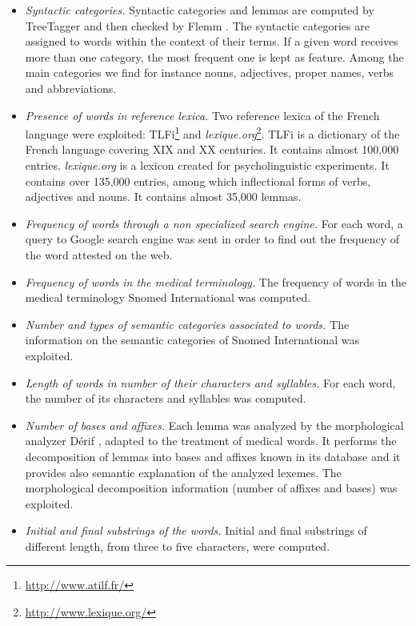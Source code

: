 \begin{itemize}
\item {\it Syntactic categories.}  Syntactic categories and lemmas are
  computed by TreeTagger \citep{Schmid-1994} and then checked
   by Flemm
  \citep{Namer-TAL2000}.  The syntactic categories are assigned to
  words within the context of their terms.  If a given word receives
  more than one category, the most frequent one is kept as feature.
  Among the main categories we find for instance nouns, adjectives,
  proper names, verbs and abbreviations.
\item {\it Presence of words in reference lexica.} Two
  reference lexica of the French language were exploited:
  TLFi\footnote{\url{http://www.atilf.fr/}} and {\it lexique.org}\footnote{\url{http://www.lexique.org/}}. TLFi is
  a dictionary of the French language covering XIX and XX
  centuries. It contains almost 100,000 entries. {\it lexique.org} is
  a lexicon created for psycholinguistic experiments. It contains over
  135,000 entries, among which inflectional forms of verbs, adjectives
  and nouns. It contains almost 35,000 lemmas.
\item {\it Frequency of words through a non specialized search
    engine.} For each word, a query to Google search engine was sent in order to find out the frequency of the word attested on the web.
\item {\it Frequency of words in the medical terminology.} The frequency of words in the medical terminology Snomed International was computed.
\item {\it Number and types of semantic categories associated to
    words.} The information on the semantic categories of
  Snomed International was exploited.
\item {\it Length of words in number of their characters and
    syllables.} For each word, the number of its characters
  and syllables was computed.
\item {\it Number of bases and affixes.} Each lemma was analyzed by the
  morphological analyzer D\'erif \citep{Namer-AMIA2004}, adapted to the
  treatment of medical words. It performs the decomposition of lemmas
  into bases and affixes known in its database and it provides also
  semantic explanation of the analyzed lexemes. The
  morphological decomposition information (number of affixes and
  bases) was exploited.
\item {\it Initial and final substrings of the words.} Initial and final substrings of different length, from three to five characters, were computed.

\end{itemize}
